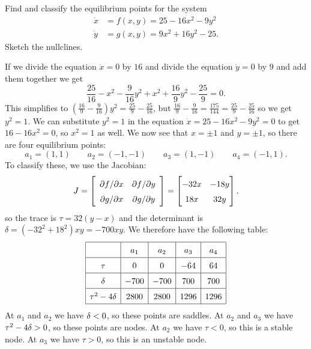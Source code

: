 \documentclass[a4paper]{amsart}
\begin{document}
\begin{exercise}\label{ex-quad-a}
 Find and classify the equilibrium points for the system 
 \begin{align*}
  \dot{x} &= f(x,y) = 25 - 16x^2 - 9y^2 \\
  \dot{y} &= g(x,y) = 9x^2 + 16y^2 - 25.
 \end{align*}
 Sketch the nullclines.
\end{exercise}
\begin{solution}
 If we divide the equation $\dot{x}=0$ by $16$ and divide the equation
 $\dot{y}=0$ by $9$ and add them together we get
 \[ \frac{25}{16} - x^2 - \frac{9}{16}y^2 + x^2 + \frac{16}{9}y^2 - \frac{25}{9}=0. \]
 This simplifies to
 $(\frac{16}{9}-\frac{9}{16})y^2=\frac{25}{9}-\frac{25}{16}$, but 
 $\frac{16}{9}-\frac{9}{16}=\frac{175}{144}=\frac{25}{9}-\frac{25}{16}$
 so we get $y^2=1$.  We can substitute $y^2=1$ in the equation
 $\dot{x}=25-16x^2-9y^2=0$ to get $16-16x^2=0$, so $x^2=1$ as well.
 We now see that $x=\pm 1$ and $y=\pm 1$, so there are four
 equilibrium points:
 \[ a_1 = (1,1) \qquad 
    a_2 = (-1,-1) \qquad
    a_3 = (1,-1) \qquad
    a_4 = (-1,1).
 \]
 To classify these, we use the Jacobian:
 \[ J = \left[\begin{array}{cc} \partial f/\partial x & \partial f/\partial y \\
             \partial g/\partial x & \partial g/\partial y \end{array}\right]
      = \bbm -32x & -18y \\ 18x & 32y \ebm.
 \]
 so the trace is $\tau=32(y-x)$ and the determinant is
 $\delta=(-32^2+18^2)xy=-700xy$.  We therefore have the following table:
 \[ \renewcommand\arraystretch{1.5} \begin{array}{|c|c|c|c|c|}
  \hline
                 & a_1  & a_2  & a_3  & a_4  \\ \hline
  \tau           &    0 &    0 &  -64 &   64 \\ \hline 
  \delta         & -700 & -700 &  700 &  700 \\ \hline
  \tau^2-4\delta & 2800 & 2800 & 1296 & 1296 \\ \hline
 \end{array} \]
 At $a_1$ and $a_2$ we have $\delta<0$, so these points are saddles.  At $a_2$ and
 $a_3$ we have $\tau^2-4\delta>0$, so these points are nodes.  At $a_2$ we have
 $\tau<0$, so this is a stable node.  At $a_3$ we have $\tau>0$, so this is an
 unstable node.  


\end{solution}
\end{document}
